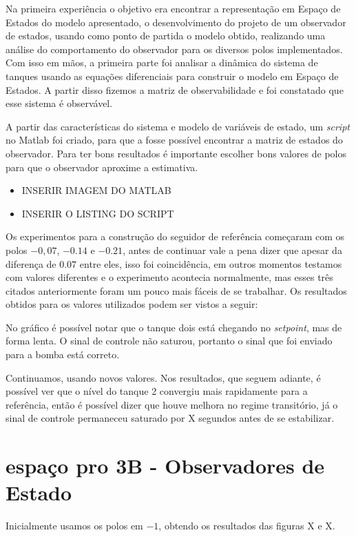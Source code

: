 \documentclass[
	12pt,				%
	openany,			%
	oneside,			%
	a4paper,			%
	english,			%
	french,				%
	spanish,			%
	brazil,				%
	]{abntex2}
\begin{document}
{Na primeira experiência o objetivo era encontrar a representação em Espaço de Estados do modelo apresentado, o desenvolvimento do projeto de um observador de estados, usando como ponto de partida o modelo obtido, realizando uma análise do comportamento do observador para os diversos polos implementados. Com isso em mãos, a primeira parte foi analisar a dinâmica do sistema de tanques usando as equações diferenciais para construir o modelo em Espaço de Estados. A partir disso fizemos a matriz de observabilidade e foi constatado que esse sistema é observável.

A partir das características do sistema e modelo de variáveis de estado, um \textit{script} no Matlab foi criado, para que a fosse possível encontrar a matriz de estados do observador. Para ter bons resultados é importante escolher bons valores de polos para que o observador aproxime a estimativa.

\begin{itemize}
	\item INSERIR IMAGEM DO MATLAB
	\item INSERIR O LISTING DO SCRIPT
\end{itemize}

Os experimentos para a construção do seguidor de referência começaram com os polos $-0,07$, $-0.14$ e $-0.21$, antes de continuar vale a pena dizer que apesar da diferença de $0.07$ entre eles, isso foi coincidência, em outros momentos testamos com valores diferentes e o experimento acontecia normalmente, mas esses três citados anteriormente foram um pouco mais fáceis de se trabalhar. Os resultados obtidos para os valores utilizados podem ser vistos a seguir:


No gráfico é possível notar que o tanque dois está chegando no \textit{setpoint}, mas de forma lenta. O sinal de controle não saturou, portanto o sinal que foi enviado para a bomba está correto.

Continuamos, usando novos valores. Nos resultados, que seguem adiante, é possível ver que o nível do tanque 2 convergiu mais rapidamente para a referência, então é possível dizer que houve melhora no regime transitório, já o sinal de controle permaneceu saturado por X segundos antes de se estabilizar.

\section{espaço pro 3B - Observadores de Estado}
Inicialmente usamos os polos em $-1$, obtendo os resultados das figuras X e X.

}
\end{document}

